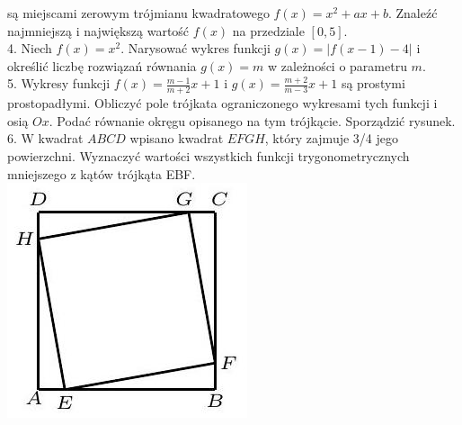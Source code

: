 \documentclass[10pt]{article}
\begin{document}
są miejscami zerowym trójmianu kwadratowego $f(x)=x^{2}+a x+b$. Znaleźć najmniejszą i największą wartość $f(x)$ na przedziale $[0,5]$.\\
4. Niech $f(x)=x^{2}$. Narysować wykres funkcji $g(x)=|f(x-1)-4|$ i określić liczbę rozwiązań równania $g(x)=m$ w zależności o parametru $m$.\\
5. Wykresy funkcji $f(x)=\frac{m-1}{m+2} x+1$ i $g(x)=\frac{m+2}{m-3} x+1$ są prostymi prostopadłymi. Obliczyć pole trójkata ograniczonego wykresami tych funkcji i osią $O x$. Podać równanie okręgu opisanego na tym trójkącie. Sporządzić rysunek.\\
6. W kwadrat $A B C D$ wpisano kwadrat $E F G H$, który zajmuje 3/4 jego powierzchni. Wyznaczyć wartości wszystkich funkcji trygonometrycznych mniejszego z kątów trójkąta EBF.\\
\includegraphics[max width=\textwidth, center]{2024_11_16_77c2ef888396535263bbg-1}
\end{document}
